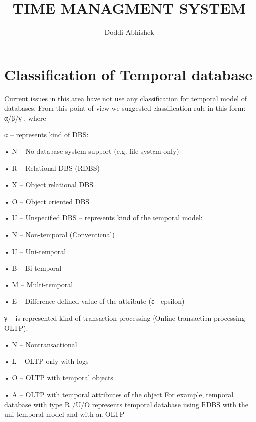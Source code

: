 \documentclass{article}
\title{TIME MANAGMENT SYSTEM}
\author{Doddi Abhishek}
\begin{document}
\maketitle



\section{Classification of Temporal database }

Current issues in this area have not use any classification for temporal model of databases. From this point of view we
suggested classification rule in this form:
α/β/γ ,
where
\item α – represents kind of DBS:
\item• N – No database system support (e.g. file system only)
\item• R – Relational DBS (RDBS)
\item• X – Object relational DBS
\item• O – Object oriented DBS
\item• U – Unspecified DBS
 – represents kind of the temporal model:
\item• N – Non-temporal (Conventional)
\item• U – Uni-temporal
\item• B – Bi-temporal
\item• M – Multi-temporal
\item• E – Difference defined value of the attribute (ε - epsilon)
\item γ – is represented kind of transaction processing (Online transaction processing - OLTP):
\item• N – Nontransactional
\item• L – OLTP only with logs
\item• O – OLTP with temporal objects
\item• A – OLTP with temporal attributes of the object
For example, temporal database with type R /U/O represents temporal database using RDBS with the uni-temporal
model and with an OLTP
\end{document}
